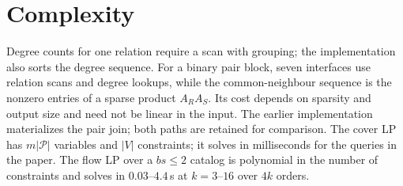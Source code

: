 \documentclass[11pt]{article}
\begin{document}
\section{Complexity}
Degree counts for one relation require a scan with grouping; the implementation also sorts the degree sequence. For a binary pair block, seven interfaces use relation scans and degree lookups, while the common-neighbour sequence is the nonzero entries of a sparse product $A_RA_S$. Its cost depends on sparsity and output size and need not be linear in the input. The earlier implementation materializes the pair join; both paths are retained for comparison. The cover LP has $m|\mathcal P|$ variables and $|V|$
constraints; it solves in milliseconds for the queries in the paper. The
flow LP over a $bs\le2$ catalog is polynomial in the number of constraints
and solves in $0.03$--$4.4$\,s at $k=3$--$16$ over $4k$ orders.
\end{document}
